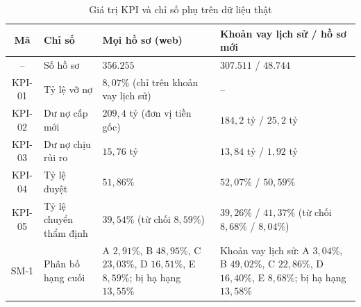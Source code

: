 \begin{table}[H]
	\centering
	\caption{Giá trị KPI và chỉ số phụ trên dữ liệu thật}
	\label{tab:kpi-values}
	\footnotesize
	\begin{tabular}{c p{3.2cm} p{5.4cm} p{5cm}}
		\toprule
		\textbf{Mã} & \textbf{Chỉ số}                 & \textbf{Mọi hồ sơ (web)}                                                                        & \textbf{Khoản vay lịch sử / hồ sơ mới}                                                                             \\
		\midrule
		--          & Số hồ sơ                        & $356.255$                                                                                       & $307.511$ / $48.744$                                                                                               \\
		KPI-01      & Tỷ lệ vỡ nợ                     & $8{,}07\%$ (chỉ trên khoản vay lịch sử)                                                         & --                                                                                                                 \\
		KPI-02      & Dư nợ cấp mới                   & $209{,}4$ tỷ (đơn vị tiền gốc)                                                                  & $184{,}2$ tỷ / $25{,}2$ tỷ                                                                                         \\
		KPI-03      & Dư nợ chịu rủi ro               & $15{,}76$ tỷ                                                                                    & $13{,}84$ tỷ / $1{,}92$ tỷ                                                                                         \\
		KPI-04      & Tỷ lệ duyệt                     & $51{,}86\%$                                                                                     & $52{,}07\%$ / $50{,}59\%$                                                                                          \\
		KPI-05      & Tỷ lệ chuyển thẩm định          & $39{,}54\%$ (từ chối $8{,}59\%$)                                                                & $39{,}26\%$ / $41{,}37\%$ (từ chối $8{,}68\%$ / $8{,}04\%$)                                                        \\
		SM-1        & Phân bố hạng cuối               & A $2{,}91\%$, B $48{,}95\%$, C $23{,}03\%$, D $16{,}51\%$, E $8{,}59\%$; bị hạ hạng $13{,}55\%$ & Khoản vay lịch sử: A $3{,}04\%$, B $49{,}02\%$, C $22{,}86\%$, D $16{,}40\%$, E $8{,}68\%$; bị hạ hạng $13{,}58\%$ \\

\end{tabular}
\end{table}
